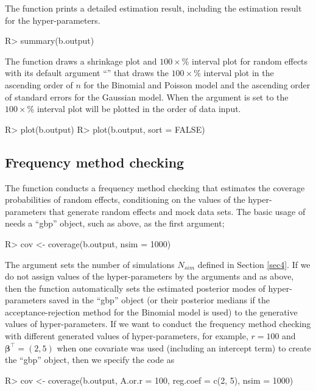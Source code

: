 \documentclass[article]{jss}
\begin{document}
The function  prints a detailed estimation result, including the estimation result for the hyper-parameters.
\begin{CodeChunk}
\begin{CodeInput}
R> summary(b.output)
\end{CodeInput}
\end{CodeChunk}

The function  draws a shrinkage plot and $100\times$\% interval plot for random effects with its default argument ``'' that draws the $100\times$\% interval plot in the ascending order of $n$ for the Binomial and Poisson model and the ascending order of standard errors for the Gaussian model. When the argument  is set to   the $100\times$\% interval plot will be plotted in the order of data input.
\begin{CodeChunk}
\begin{CodeInput}
R> plot(b.output)
R> plot(b.output, sort = FALSE)
\end{CodeInput}
\end{CodeChunk}

\subsection{Frequency method checking}
The function  conducts a frequency method checking that estimates the coverage probabilities of  random effects, conditioning on the values of the hyper-parameters that generate random effects and  mock data sets. The basic usage of  needs a ``gbp'' object, such as  above, as the first argument;
\begin{CodeChunk}
\begin{CodeInput}
R> cov <- coverage(b.output, nsim = 1000)
\end{CodeInput}
\end{CodeChunk}

The argument  sets the number of simulations $N_{sim}$ defined in Section \ref{sec4}. If we do not assign values of the hyper-parameters by the arguments  and  as above, then the function  automatically sets the estimated posterior modes of hyper-parameters saved in the ``gbp'' object (or their posterior medians if the acceptance-rejection method for the Binomial model is used) to the generative values of hyper-parameters. If we want to conduct the frequency method checking with different generated values of hyper-parameters, for example, $r=100$ and $\boldsymbol{\beta}^\top=(2, 5)$ when one covariate was used (including an intercept term) to create the ``gbp'' object, then we specify the code as
\begin{CodeChunk}
\begin{CodeInput}
R> cov <- coverage(b.output, A.or.r = 100, reg.coef = c(2, 5), nsim = 1000)
\end{CodeInput}
\end{CodeChunk}
\end{document}
